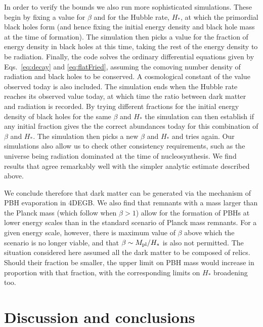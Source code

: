 \documentclass[reprint,amsmath,amssymbGaps,onecolumn,notitlepage,nofootinbib]{revtex4-1}
\begin{document}
In order to verify the bounds we also run more sophisticated simulations. These 
begin by fixing a value for $\beta$ and for the Hubble rate, $H_*$, at which the primordial black holes form (and hence fixing the initial energy density and black hole mass at the time of formation). The simulation then picks a value for the fraction of energy density in 
black holes at this time, taking the rest of the energy density to be radiation. Finally, the code solves the ordinary differential equations given by Eqs.~\eqref{eq:decay} and  \eqref{eq:flatFried}, assuming 
the comoving number density of radiation and black holes to be conserved. A cosmological constant of the value observed today is also included. The simulation ends when the Hubble rate reaches its observed value today, at which time the ratio between dark matter and radiation is recorded. By trying different fractions for the initial energy density of black holes for the same $\beta$ and $H_*$ the simulation can then establish if any initial fraction gives the the correct abundances today for this combination of $\beta$ and $H_*$. The simulation then picks a new $\beta$ and $H_*$ and tries again.
Our simulations also allow us to check other consistency requirements, such as the universe being radiation dominated at the time of nucleosynthesis. We find results that agree remarkably well with the simpler analytic estimate described above. 

We conclude therefore that dark matter can be generated via the mechanism of PBH evaporation in 4DEGB. We also find that remnants with a mass larger than the Planck mass (which follow when $\beta >1$) allow for the formation of PBHs at lower energy scales than in the standard scenario of Planck mass remnants. For a given energy scale, however, there is maximum value of $\beta$ above which the scenario is no longer viable, and that $\beta\sim M_{\rm pl}/H_*$ is also not permitted. The situation considered here assumed all the dark matter to be composed of relics. Should their fraction be smaller, the upper limit on PBH mass would increase in proportion with that fraction, with the corresponding limits on $H_*$ broadening too.

\section{Discussion and conclusions}
\label{Discussion}
\end{document}
